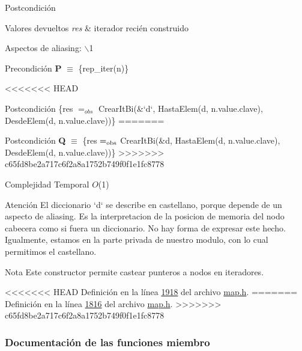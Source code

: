 \begin{Indent}
\begin{DoxyPostcond}{\-Postcondición}
\begin{DoxyRetVals}{\-Valores devueltos}
{\em res} & iterador recién construido\\
\hline
\end{DoxyRetVals}
\begin{DoxyParagraph}{\-Aspectos de aliasing\-:}
$\backslash$1
\end{DoxyParagraph}
\begin{DoxyPrecond}{\-Precondición}
{\bfseries \-P} $\equiv$ \{rep\-\_\-iter(n)\} 
\end{DoxyPrecond}
<<<<<<< HEAD
\begin{DoxyPostcond}{\-Postcondición}
\{res $=_{obs}$ \-Crear\-It\-Bi(\&`d`, \-Hasta\-Elem(d, n.\-value.\-clave), \-Desde\-Elem(d, n.\-value.\-clave))\}
=======
\begin{DoxyPostcond}{Postcondición}
{\bfseries Q} $\equiv$ \{res $=_{\rm obs}$ Crear\+It\+Bi(\&{\ttfamily d}, Hasta\+Elem(d, n.\+value.\+clave), Desde\+Elem(d, n.\+value.\+clave))\}
>>>>>>> c65fd8be2a717c6f2a8a1752b749f0f1e1fc8778
\end{DoxyPostcond}

\begin{DoxyDescription}
\item[\-Complejidad \-Temporal]$O$(1)
\end{DoxyDescription}

\begin{DoxyAttention}{\-Atención}
\-El diccionario `d` se describe en castellano, porque depende de un aspecto de aliasing. \-Es la interpretacion de la posicion de memoria del nodo cabecera como si fuera un diccionario. \-No hay forma de expresar este hecho. \-Igualmente, estamos en la parte privada de nuestro modulo, con lo cual permitimos el castellano.
\end{DoxyAttention}
\begin{DoxyNote}{\-Nota}
\-Este constructor permite castear punteros a nodos en iteradores. 
\end{DoxyNote}


<<<<<<< HEAD
\-Definición en la línea \hyperlink{map_8h_source_l01918}{1918} del archivo \hyperlink{map_8h_source}{map.\-h}.
=======
Definición en la línea \hyperlink{map_8h_source_l01816}{1816} del archivo \hyperlink{map_8h_source}{map.\+h}.
>>>>>>> c65fd8be2a717c6f2a8a1752b749f0f1e1fc8778



\subsubsection{\-Documentación de las funciones miembro}
\hypertarget{classaed2_1_1map_1_1iterator_a48e75896997d516fe69bc18f889222fe_a48e75896997d516fe69bc18f889222fe}{
}
\end{DoxyPostcond}
\end{DoxyPostcond}
\end{Indent}
